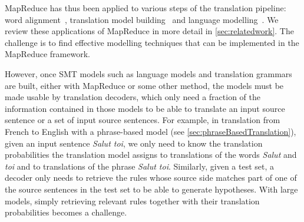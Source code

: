 %
MapReduce has thus been applied to various steps of the
translation
pipeline:
word alignment~\citep{dyer-cordova-mont-lin:2008:WMT},
translation model building~\citep{dyer-cordova-mont-lin:2008:WMT}
and
language
modelling~\citep{brants-popat-xu-och-dean:2007:EMNLP-CoNLL}.
We review these applications of MapReduce in more detail
in \autoref{sec:relatedwork}. The challenge is to find
effective modelling techniques that can be implemented
in the MapReduce framework.

However, once SMT models such as language models and translation
grammars are built, either with MapReduce
or some other method, the models must be made usable
by translation decoders, which only need a fraction of the information
contained in those models to be able to translate an input source sentence or a
set of input source sentences. For example, in translation from French to
English with a phrase-based
model (see \autoref{sec:phraseBasedTranslation}),
given an input sentence \emph{Salut toi}, we only need to know the
translation probabilities the translation model assigns to translations of
the words
\emph{Salut} and \emph{toi} and to translations of the phrase \emph{Salut toi}.
Similarly, given a test set, a decoder
only needs to retrieve the rules whose source side matches part of one of the source
sentences in the test set to be able to generate hypotheses.
With large models, simply retrieving relevant rules together with their
translation
probabilities becomes a challenge.


